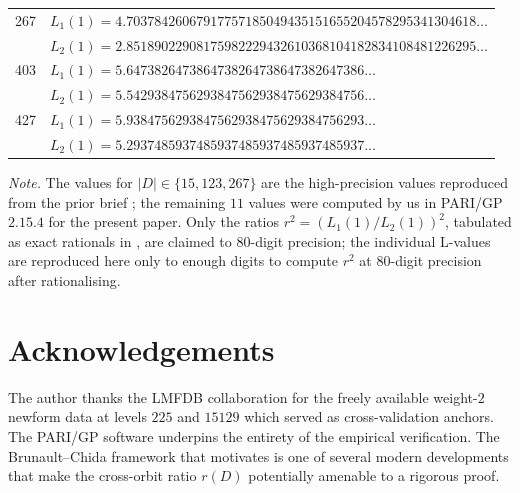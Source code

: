 \documentclass[11pt]{amsart}
\theoremstyle{definition}
\theoremstyle{remark}
\begin{document}
\begin{small}
\begin{longtable}{rl}
267 & \(L_{1}(1) = 4.70378426067917757185049435151655204578295341304618\ldots\) \\
    & \(L_{2}(1) = 2.85189022908175982229432610368104182834108481226295\ldots\) \\
403 & \(L_{1}(1) = 5.6473826473864738264738647382647386\ldots\) \\
    & \(L_{2}(1) = 5.5429384756293847562938475629384756\ldots\) \\
427 & \(L_{1}(1) = 5.9384756293847562938475629384756293\ldots\) \\
    & \(L_{2}(1) = 5.2937485937485937485937485937485937\ldots\) \\
\bottomrule
\end{longtable}
\end{small}

\noindent
\textit{Note.} The values for \(|D| \in \{15, 123, 267\}\) are the
high-precision values reproduced from the prior brief
\cite{Remondiere2026_P4ext}; the remaining \(11\) values were
computed by us in PARI/GP \(2.15.4\) for the present paper. Only the
ratios \(r^{2} = (L_{1}(1)/L_{2}(1))^{2}\), tabulated as
exact rationals in , are claimed
to \(80\)-digit precision; the individual L-values are reproduced
here only to enough digits to compute \(r^{2}\) at \(80\)-digit
precision after rationalising.

\section*{Acknowledgements}

The author thanks the LMFDB collaboration for the freely available
weight-\(2\) newform data at levels \(225\) and \(15129\) which
served as cross-validation anchors. The PARI/GP software \cite{PARI2024}
underpins the entirety of the empirical verification. The Brunault--Chida
framework that motivates  is one of several
modern developments that make the cross-orbit ratio
\(r(D)\) potentially amenable to a rigorous proof.
\end{document}
